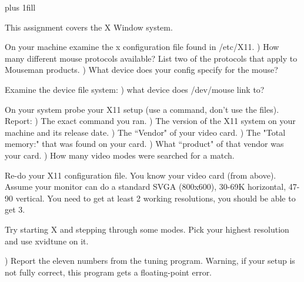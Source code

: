 
\rightskip=0pt plus 1fill

\parindent 0pt

This assignment covers the X Window system.

On your machine examine the x configuration file found in {\ltt{}/etc/X11}.
\hfill{}) How many different mouse protocols available?
List two of the protocols that apply to Mouseman products.
\hfill{}) What device does your config specify for the mouse?

Examine the device file system:
\hfill{}) what device does {\ltt{}/dev/mouse} link to?

On your system probe your X11 setup (use a command, don't use
the files).
Report:
\hfill{}) The exact command you ran.
\hfill{}) The version of the X11 system on your machine and its release date.
\hfill{}) The ``Vendor" of your video card.
\hfill{}) The "Total memory:" that was found on your card.
\hfill{}) What ``product" of that vendor was your card.
\hfill{}) How many video modes were searched for a match.

Re-do your X11 configuration file.
You know your video card (from above).
Assume your monitor can do a standard SVGA (800x600), 30-69K horizontal,
47-90 vertical.
You need to get at least 2 working resolutions,
you should be able to get 3.

Try starting X and stepping through some modes. Pick your
highest resolution and use {\ltt{}xvidtune} on it.

\hfill{}) Report the eleven numbers from the tuning program.
Warning, if your setup is not fully correct,
this program gets a floating-point error.

\bye
